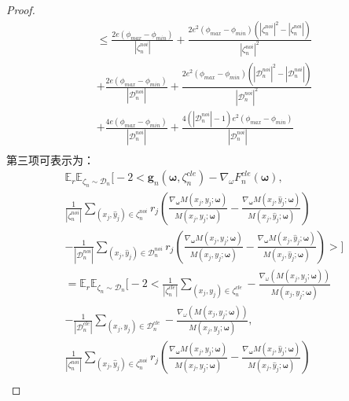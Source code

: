 \begin{proof}
\begin{multline}
    \leq \frac{2e\left(\phi_{max}-\phi_{min}\right)}{|\zeta_n^{noi}|}+\frac{2e^2\left(\phi_{max}-\phi_{min}\right)\left(|\zeta_n^{noi}|^2-|\zeta_n^{noi}|\right)}{|\zeta_n^{noi}|^2}\\
    +\frac{2e\left(\phi_{max}-\phi_{min}\right)}{|\mathcal{D}_n^{noi}|}+\frac{2e^2\left(\phi_{max}-\phi_{min}\right)\left(|\mathcal{D}_n^{noi}|^2-|\mathcal{D}_n^{noi}|\right)}{|\mathcal{D}_n^{noi}|^2}\\
    +\frac{4e\left(\phi_{max}-\phi_{min}\right)}{|\mathcal{D}_n^{noi}|}+\frac{4\left(|\mathcal{D}_n^{noi}|-1\right)e^2\left(\phi_{max}-\phi_{min}\right)}{|\mathcal{D}_n^{noi}|}\\
\end{multline}
\noindent 第三项可表示为：
\begin{multline}\label{eq:proof-b-v4}
    \mathbb{E}_{r}\mathbb{E}_{\zeta_n\sim \mathcal{D}_n}\Biggl[-2<\boldsymbol{g}_n\left(\boldsymbol{\omega},\zeta_n^{cle}\right)-\nabla_\omega  F_n^{cle}\left(\boldsymbol{\omega}\right),\\
    \frac{1}{|\zeta_n^{noi}|}\sum_{\left(x_j,\hat{y}_j\right)\in \zeta_n^{noi}}r_j\left(\frac{\nabla_{\boldsymbol{\omega}} M\left(x_j, y_j; \boldsymbol{\omega}\right)}{M\left(x_j, y_j; \boldsymbol{\omega}\right)} -\frac{\nabla_{\boldsymbol{\omega}} M\left(x_j, \hat{y}_j; \boldsymbol{\omega}\right)}{M\left(x_j, \hat{y}_j; \boldsymbol{\omega}\right)}\right)\\
    -\frac{1}{|\mathcal{D}_n^{noi}|}\sum_{\left(x_j,\hat{y}_j\right)\in \mathcal{D}_n^{noi}}r_j\left(\frac{\nabla_{\boldsymbol{\omega}} M\left(x_j, y_j; \boldsymbol{\omega}\right)}{M\left(x_j, y_j; \boldsymbol{\omega}\right)} -\frac{\nabla_{\boldsymbol{\omega}} M\left(x_j, \hat{y}_j; \boldsymbol{\omega}\right)}{M\left(x_j, \hat{y}_j; \boldsymbol{\omega}\right)}\right)>\Biggl]\\
    =\mathbb{E}_{r}\mathbb{E}_{\zeta_n\sim \mathcal{D}_n}\Biggl[-2<\frac{1}{|\zeta_n^{cle}|}\sum_{\left(x_j,y_j\right)\in \zeta_n^{cle}}-\frac{ \nabla_\omega \left(M\left(x_j, y_j; \boldsymbol{\omega}\right)\right)}{M\left(x_j, y_j; \boldsymbol{\omega}\right)}\\
    -\frac{1}{|\mathcal{D}_n^{cle}|}\sum_{\left(x_j,y_j\right)\in \mathcal{D}_n^{cle}} -\frac{ \nabla_\omega \left(M\left(x_j, y_j; \boldsymbol{\omega}\right)\right)}{M\left(x_j, y_j; \boldsymbol{\omega}\right)},\\
    \frac{1}{|\zeta_n^{noi}|}\sum_{\left(x_j,\hat{y}_j\right)\in \zeta_n^{noi}}r_j\left(\frac{\nabla_{\boldsymbol{\omega}} M\left(x_j, y_j; \boldsymbol{\omega}\right)}{M\left(x_j, y_j; \boldsymbol{\omega}\right)} -\frac{\nabla_{\boldsymbol{\omega}} M\left(x_j, \hat{y}_j; \boldsymbol{\omega}\right)}{M\left(x_j, \hat{y}_j; \boldsymbol{\omega}\right)}\right)\\

\end{multline}
\end{proof}
